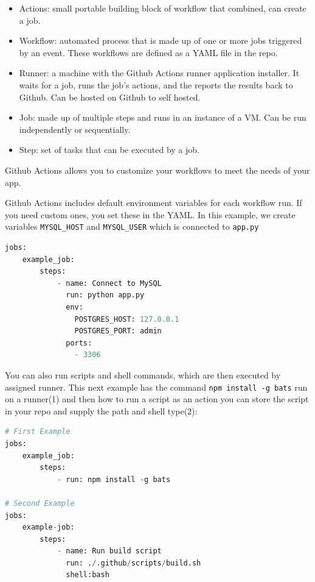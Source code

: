 \documentclass[11pt]{article}
\begin{document}
\begin{itemize}
    \item[] Actions: small portable building block of workflow that combined, can create a job.
    \item[] Workflow: automated process that is made up of one or more jobs triggered by an event. These workflows are defined as a YAML file in the repo. 
    \item[] Runner: a machine with the Github Actions runner application installer. It waits for a job, runs the job's actions, and the reports the results back to Github. Can be hosted on Github to self hosted.
    \item[] Job: made up of multiple steps and runs in an instance of a VM. Can be run independently or sequentially.
    \item[] Step: set of tasks that can be executed by a job.
\end{itemize}

\noindent Github Actions allows you to customize your workflows to meet the needs of your app. 

\noindent Github Actions includes default environment variables for each workflow run. If you need custom ones, you set these in the YAML. In this example, we create variables \texttt{MYSQL\_HOST} and \texttt{MYSQL\_USER} which is connected to \texttt{app.py}

\begin{lstlisting}[language=python]
jobs:
    example_job:
        steps:
            - name: Connect to MySQL
              run: python app.py
              env:
                POSTGRES_HOST: 127.0.0.1
                POSTGRES_PORT: admin
              ports:
                - 3306
\end{lstlisting}

\noindent You can also run scripts and shell commands, which are then executed by assigned runner. This next example has the command \texttt{npm install -g bats} run on a runner(1) and then how to run a script as an action you can store the script in your repo and supply the path and shell type(2):

\begin{lstlisting}[language=python]
# First Example
jobs:
    example_job:
        steps:
            - run: npm install -g bats

# Second Example
jobs:
    example-job:
        steps:
            - name: Run build script
              run: ./.github/scripts/build.sh
              shell:bash
\end{lstlisting}
\end{document}
